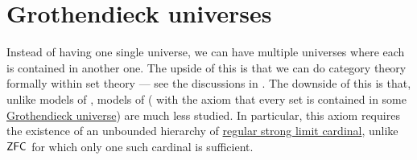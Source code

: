 \section{Grothendieck universes}\label{sec:grothendieck_universes}

Instead of having one single universe, we can have multiple universes where each is contained in another one. The upside of this is that we can do category theory formally within set theory --- see the discussions in . The downside of this is that, unlike models of \hyperref[def:zfc]{}, models of \hyperref[def:axiom_of_universes]{} ( with the axiom that every set is contained in some \hyperref[def:grothendieck_universe]{Grothendieck universe}) are much less studied. In particular, this axiom requires the existence of an unbounded hierarchy of \hyperref[rem:strongly_inaccessible_cardinal]{regular strong limit cardinal}, unlike \( \textsf{ZFC} \) for which only one such cardinal is sufficient.

